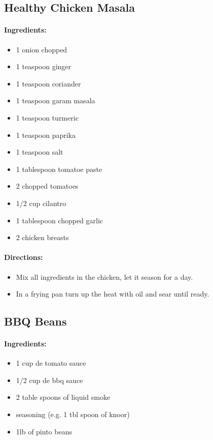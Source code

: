 \documentclass{article}
\begin{document}
\subsection{Healthy Chicken Masala}

\paragraph{Ingredients:}
\begin{itemize}
    \item 1 onion chopped
    \item 1 teaspoon ginger
    \item 1 teaspoon coriander
    \item 1 teaspoon garam masala
    \item 1 teaspoon turmeric
    \item 1 teaspoon paprika
    \item 1 teaspoon salt
    \item 1 tablespoon tomatoe paste
    \item 2 chopped tomatoes
    \item 1/2 cup cilantro
    \item 1 tablespoon chopped garlic
    \item 2 chicken breasts
\end{itemize}

\paragraph{Directions:}
\begin{itemize}
    \item Mix all ingredients in the chicken, let it season for a day.
    \item In a frying pan turn up the heat with oil and sear until ready.
\end{itemize}

\subsection{BBQ Beans}

\paragraph{Ingredients:}
\begin{itemize}
    \item 1 cup de tomato sauce
    \item 1/2 cup de bbq sauce
    \item 2 table spoons of liquid smoke
    \item seasoning (e.g. 1 tbl spoon of knoor)
    \item 1lb of pinto beans
\end{itemize}
\end{document}
